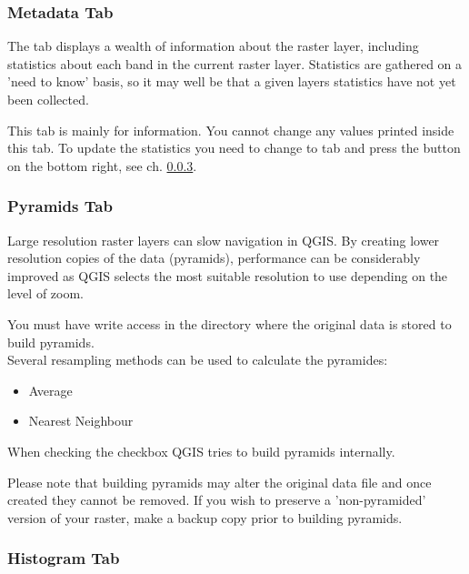 \subsubsection{Metadata Tab}\label{label_metatab}

The  tab displays a wealth of information about the raster layer,
including statistics about each band in the current raster layer. Statistics
are gathered on a 'need to know' basis, so it may well be that a given layers
statistics have not yet been collected.

This tab is mainly for information. You cannot change any values printed
inside this tab. To update the statistics you need to change to tab
 and press the button  on the bottom right,
see ch. \ref{label_histogram}.

\subsubsection{Pyramids Tab}\label{raster_pyramids}

Large resolution raster layers can slow navigation in QGIS. By creating lower
resolution copies of the data (pyramids), performance can be considerably
improved as QGIS selects the most suitable resolution to use depending on the
level of zoom.

You must have write access in the directory where the original data is stored
to build pyramids. \\
Several resampling methods can be used to calculate the pyramides:
\begin{itemize}
\item Average
\item Nearest Neighbour
\end{itemize}

When checking the checkbox  QGIS tries to build pyramids internally.

Please note that building pyramids may alter the original data file and once
created they cannot be removed. If you wish to preserve a 'non-pyramided'
version of your raster, make a backup copy prior to building pyramids.

\subsubsection{Histogram Tab}\label{label_histogram}

